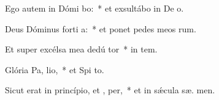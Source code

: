 \item Ego autem in Dómi bo:~* et exsultábo in De  o.
\item Deus Dóminus forti a:~* et ponet pedes meos  rum.
\item Et super excélsa mea dedú  tor~* in  tem.
\item Glória Pa,  lio,~* et Spi to.
\item Sicut erat in princípio, et ,  per,~* et in sǽcula sæ. men.
